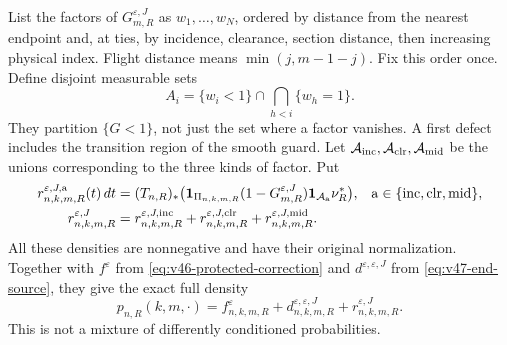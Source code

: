 List the factors of $G_{m,R}^{\varepsilon,J}$ as $w_1,\ldots,w_N$,
ordered by distance from the nearest endpoint and, at ties, by incidence,
clearance, section distance, then increasing physical index. Flight
distance means $\min(j,m-1-j)$. Fix this order once. Define disjoint
measurable sets
\begin{equation}\label{eq:v47-first-defect}
 A_i=\{w_i<1\}\cap\bigcap_{h<i}\{w_h=1\}.
\end{equation}
They partition $\{G<1\}$, not just the set where a factor vanishes.
A first defect includes the transition region of the smooth guard.
Let $\mathcal A_{\rm inc},\mathcal A_{\rm clr},\mathcal A_{\rm mid}$
be the unions corresponding to the three kinds of factor. Put
\begin{align}
 r^{\varepsilon,J,\mathrm a}_{n,k,m,R}(t)\,dt
  &=(T_{n,R})_*
    \bigl(\one_{\Pi_{n,k,m,R}}(1-G_{m,R}^{\varepsilon,J})
              \one_{\mathcal A_{\mathrm a}}\nu_R^*\bigr),
       &&\mathrm a\in\{\mathrm{inc},\mathrm{clr},\mathrm{mid}\},
                                                         \notag\\
 r^{\varepsilon,J}_{n,k,m,R}
  &=r^{\varepsilon,J,\mathrm{inc}}_{n,k,m,R}
    +r^{\varepsilon,J,\mathrm{clr}}_{n,k,m,R}
    +r^{\varepsilon,J,\mathrm{mid}}_{n,k,m,R}.
                                      \label{eq:v47-residual-densities}
\end{align}
All these densities are nonnegative and have their original
normalization. Together with $f^\varepsilon$ from
\eqref{eq:v46-protected-correction} and $d^{\varepsilon,\varepsilon,J}$
from \eqref{eq:v47-end-source}, they give the exact full density
\begin{equation}\label{eq:v47-full-source-split}
 p_{n,R}(k,m,\cdot)=f^\varepsilon_{n,k,m,R}
            +d^{\varepsilon,\varepsilon,J}_{n,k,m,R}
            +r^{\varepsilon,J}_{n,k,m,R}.
\end{equation}
This is not a mixture of differently conditioned probabilities.

